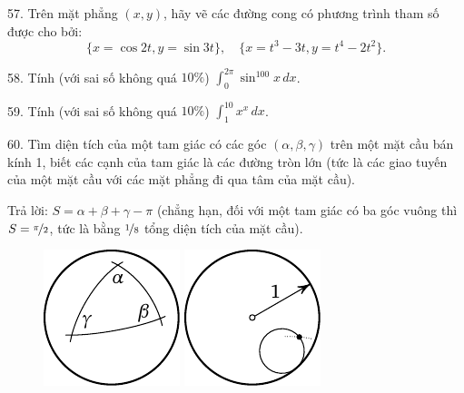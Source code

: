 \begin{problem}{57.}
	Trên mặt phẳng $(x,y)$, hãy vẽ các đường cong có phương trình tham số được cho bởi:
	\begin{equation*}
		\{x=\cos 2t, y=\sin 3t\},\quad 
		\{x=t^3-3t, y=t^4-2t^2\}.
	\end{equation*}
	\vspace{-2\baselineskip}%
\end{problem}

\begin{problem}{58.}
	Tính (với sai số không quá $10 \%$) $\int_0^{2\pi}\sin^{100}x\,dx$.
\end{problem}

\begin{problem}{59.}
	Tính (với sai số không quá $10 \%$) $\int_1^{10} x^x\,dx$.
\end{problem}

\begin{problem}{60.}
	Tìm diện tích của một tam giác có các góc $(\alpha, \beta, \gamma)$ trên một mặt cầu bán kính 1, biết các cạnh của tam giác là các đường tròn lớn (tức là các giao tuyến của một mặt cầu với các mặt phẳng đi qua tâm của mặt cầu).

	\begin{note}{Trả lời:}
		 $S=\alpha+\beta+\gamma-\pi$ (chẳng hạn, đối với một tam giác có ba góc vuông thì $S=\nicefrac{\pi}{2}$, tức là bằng $\nicefrac{1}{8}$ tổng diện tích của mặt cầu).
		\begin{figure}
			\null\hfill
			\includegraphics{resources/taskbook-44}
			\hfill
			\includegraphics{resources/taskbook-45}
			\hfill\null
		\end{figure}
	\end{note}
\end{problem}

